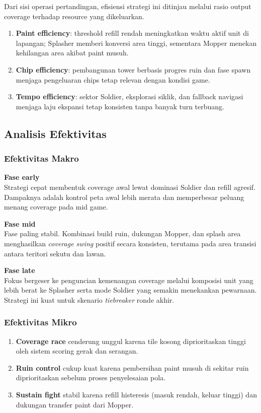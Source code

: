 Dari sisi operasi pertandingan, efisiensi strategi ini ditinjau melalui rasio output coverage terhadap resource yang dikeluarkan.

\begin{enumerate}
    \item \textbf{Paint efficiency}: threshold refill rendah meningkatkan waktu aktif unit di lapangan; Splasher memberi konversi area tinggi, sementara Mopper menekan kehilangan area akibat paint musuh.
    \item \textbf{Chip efficiency}: pembangunan tower berbasis progres ruin dan fase spawn menjaga pengeluaran chips tetap relevan dengan kondisi game.
    \item \textbf{Tempo efficiency}: sektor Soldier, eksplorasi siklik, dan fallback navigasi menjaga laju ekspansi tetap konsisten tanpa banyak turn terbuang.
\end{enumerate}

\subsection{Analisis Efektivitas}

\subsubsection{Efektivitas Makro}

\textbf{Fase early}\\
Strategi cepat membentuk coverage awal lewat dominasi Soldier dan refill agresif. Dampaknya adalah kontrol peta awal lebih merata dan memperbesar peluang menang coverage pada mid game.

\textbf{Fase mid}\\
Fase paling stabil. Kombinasi build ruin, dukungan Mopper, dan splash area menghasilkan \textit{coverage swing} positif secara konsisten, terutama pada area transisi antara teritori sekutu dan lawan.

\textbf{Fase late}\\
Fokus bergeser ke penguncian kemenangan coverage melalui komposisi unit yang lebih berat ke Splasher serta mode Soldier yang semakin menekankan pewarnaan. Strategi ini kuat untuk skenario \textit{tiebreaker} ronde akhir.

\subsubsection{Efektivitas Mikro}

\begin{enumerate}
    \item \textbf{Coverage race} cenderung unggul karena tile kosong diprioritaskan tinggi oleh sistem scoring gerak dan serangan.
    \item \textbf{Ruin control} cukup kuat karena pembersihan paint musuh di sekitar ruin diprioritaskan sebelum proses penyelesaian pola.
    \item \textbf{Sustain fight} stabil karena refill histeresis (masuk rendah, keluar tinggi) dan dukungan transfer paint dari Mopper.
\end{enumerate}

